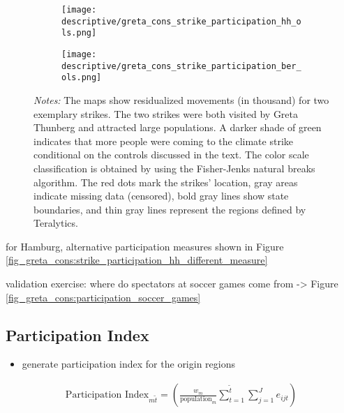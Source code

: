 \begin{figure}[H]\centering
	\caption{Strike participation for selected strikes}
	\label{fig_greta_cons:strike_participation_hh_ber}
	\begin{subfigure}[h]{0.45\linewidth}\centering
		\texttt{[image: descriptive/greta\_cons\_strike\_participation\_hh\_ols.png]}
	\end{subfigure}
	\begin{subfigure}[h]{0.45\linewidth}\centering
		\texttt{[image: descriptive/greta\_cons\_strike\_participation\_ber\_ols.png]}
	\end{subfigure}
	\begin{minipage}{0.9\linewidth}
		\scriptsize{\emph{Notes:} The maps show residualized movements (in thousand) for two exemplary strikes. The two strikes were both visited by Greta Thunberg and attracted large populations. A darker shade of green indicates that more people were coming to the climate strike conditional on the controls discussed in the text. The color scale classification is obtained by using the Fisher-Jenks natural breaks algorithm. The red dots mark the strikes' location, gray areas indicate missing data (censored), bold gray lines show state boundaries, and thin gray lines represent the regions defined by Teralytics.}
	\end{minipage}
\end{figure}


for Hamburg, alternative participation measures shown in Figure \ref{fig_greta_cons:strike_participation_hh_different_measure}

validation exercise: where do spectators at soccer games come from -> Figure \ref{fig_greta_cons:participation_soccer_games}






\subsection{Participation Index}
	
\begin{itemize}	
	\item generate participation index for the origin regions
\end{itemize}
\begin{align}
	\text{Participation Index}_{m\tilde{t}} = \left( \frac{w_{m}}{\text{population}_{m}} \sum\limits_{t=1}^{\tilde{t}}\sum\limits_{j=1}^{J} e_{ijt}\right) \label{eq_greta_cons:participation_index}
\end{align}

